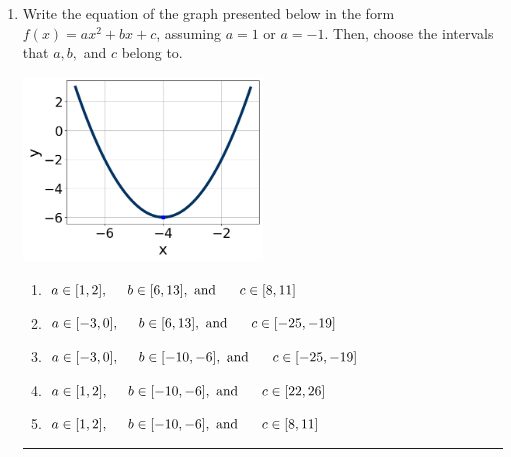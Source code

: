 \documentclass[14pt]{extbook}
\newcommand{\litem}[1]{\item#1\hspace*{-1cm}\rule{\textwidth}{0.4pt}}
\begin{document}
\begin{enumerate}
{\begin{enumerate}[label=\Alph*.]
\end{enumerate} }
\litem{
Write the equation of the graph presented below in the form $f(x)=ax^2+bx+c$, assuming  $a=1$ or $a=-1$. Then, choose the intervals that $a, b,$ and $c$ belong to.
\begin{center}
    \includegraphics[width=0.5\textwidth]{../Figures/quadraticGraphToEquationB.png}
\end{center}
\begin{enumerate}[label=\Alph*.]
\item \( a \in [1, 2], \hspace*{5mm} b \in [6, 13], \text{ and } \hspace*{5mm} c \in [8, 11] \)
\item \( a \in [-3, 0], \hspace*{5mm} b \in [6, 13], \text{ and } \hspace*{5mm} c \in [-25, -19] \)
\item \( a \in [-3, 0], \hspace*{5mm} b \in [-10, -6], \text{ and } \hspace*{5mm} c \in [-25, -19] \)
\item \( a \in [1, 2], \hspace*{5mm} b \in [-10, -6], \text{ and } \hspace*{5mm} c \in [22, 26] \)
\item \( a \in [1, 2], \hspace*{5mm} b \in [-10, -6], \text{ and } \hspace*{5mm} c \in [8, 11] \)


\end{enumerate}}
\end{enumerate}
\end{document}
